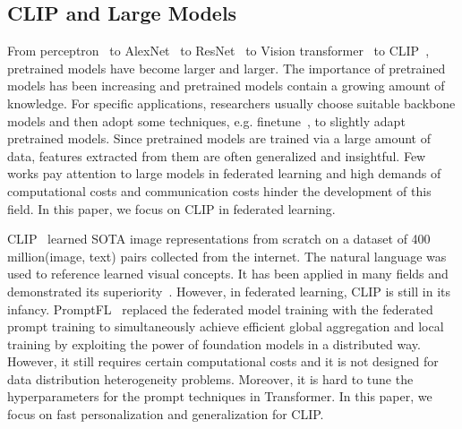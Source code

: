\subsection{CLIP and Large Models}
From perceptron~\cite{Jindong-gardner1998artificial} to AlexNet~\cite{Jindong-alom2018history} to ResNet~\cite{Jindong-he2016deep} to Vision transformer~\cite{Jindong-yuan2021tokens} to CLIP~\cite{Jindong-radford2021learning}, pretrained models have become larger and larger.
The importance of pretrained models has been increasing and pretrained models contain a growing amount of knowledge.
For specific applications, researchers usually choose suitable backbone models and then adopt some techniques, e.g. finetune~\cite{Jindong-sun2019fine}, to slightly adapt pretrained models.
Since pretrained models are trained via a large amount of data, features extracted from them are often generalized and insightful.
Few works pay attention to large models in federated learning and high demands of computational costs and communication costs hinder the development of this field.
In this paper, we focus on CLIP in federated learning.

CLIP~\cite{Jindong-radford2021learning} learned SOTA image representations from scratch on a dataset of 400 million(image, text) pairs collected from the internet.
The natural language was used to reference learned visual concepts.
It has been applied in many fields and demonstrated its superiority~\cite{Jindong-ramesh2021zero, Jindong-lee2023image}.
However, in federated learning, CLIP is still in its infancy.
PromptFL~\cite{Jindong-guo2022promptfl} replaced the federated model training with the federated prompt training to simultaneously achieve efficient global aggregation and local training by exploiting the power of foundation models in a distributed way.
However, it still requires certain computational costs and it is not designed for data distribution heterogeneity problems.
Moreover, it is hard to tune the hyperparameters for the prompt techniques in Transformer.%
In this paper, we focus on fast personalization and generalization for CLIP.
